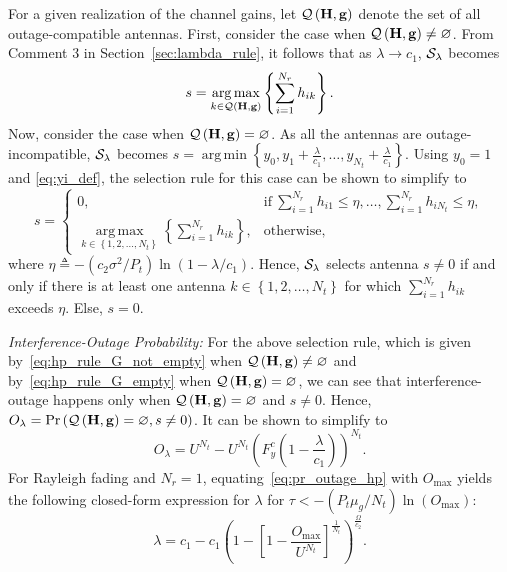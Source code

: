 \documentclass[12pt,draftcls,peerreview,onecolumn]{IEEEtran}
\newcommand{\brac}[1]{\left({#1}\right)}
\newcommand{\define}{\triangleq}
\newcommand{\tendsto}{\to}
\newcommand{\mtx}[1]{{\bf #1}} %
\newcommand{\prob}[1]{\text{Pr}\brac{#1}}
\DeclareMathOperator*{\argmin}{arg\,min}
\DeclareMathOperator*{\argmax}{arg\,max}
\newcommand{\nx}{{0}}
\newcommand{\lam}{\lambda}
\newcommand{\mug}{{\mu_{g}}}
\newcommand{\goodset}{\cal{Q\left(\Hmx,\g \right) }}
\newcommand{\Nt}{{N_t}}
\newcommand{\Nr}{{N_r}}
\newcommand{\Pt}{{P_t}}
\newcommand{\such}{h}
\newcommand{\puch}{g}
\newcommand{\hk}[1]{{\such_{#1}}}
\newcommand{\g}{\mathbf{\puch}}
\newcommand{\noisevar}{\sigma^2}
\newcommand{\outmax}{O_{\text{max}}}
\newcommand{\itau}{\tau}
\newcommand{\cone}{c_{1}}
\newcommand{\ctwo}{c_{2}}
\newcommand{\out}{O}
\newcommand{\lambym}{\frac{\lam}{\cone}}
\newcommand{\yk}[1]{y_{#1}}
\newcommand{\al}{\ctwo}
\newcommand{\snr}{\Omega}
\newcommand{\albysnr}[1][]{\frac{\al#1}{\snr}}
\newcommand{\snrbyal}[1][]{\frac{\snr#1}{\al}}
\newcommand{\un}{U}
\newcommand{\antopts}{\left\{1,2,\ldots,\Nt\right\}}
\newcommand{\igammainline}{{- \left( {\al\noisevar}/{\Pt}\right)  \ln\left({1-\lam/\cone }\right) }}
\newcommand{\Hmx}{\mtx{H}}
\newcommand{\callamrule}{{\cal S_{{\lam}}}}
\newcommand{\outlam}{\out_{\lam}}
\newcommand{\nullset}{\varnothing}
\newcommand{\ccdfyrv}[1]{ F^{c}_{y}\left(#1 \right) }
\newcommand{\sumnr}{\sum_{i=1}^{\Nr}}
\newcommand{\gammath}{\eta}
\begin{document}
For a given realization of the channel gains, let $\goodset$ denote the set of all outage-compatible antennas. First, consider the case when $\goodset\neq\nullset$. From Comment 3 in Section~\ref{sec:lambda_rule}, it follows that as $\lam \tendsto \cone$, $\callamrule$ becomes 
\begin{equation}
\label{eq:hp_rule_G_not_empty}
s = \argmax_{k\in\goodset}\left\lbrace \sumnr \hk{ik}\right\rbrace. 
\end{equation}
Now, consider the case when $\goodset= \nullset$. As all the antennas are outage-incompatible, $\callamrule$ becomes $s = \argmin\left\lbrace  \yk{0},\yk{1}+\lambym,\ldots,\yk{\Nt}+\lambym \right\rbrace$. Using $\yk{0}=1$ and \eqref{eq:yi_def}, the selection rule for this case can be shown to simplify to  
\begin{equation}
\label{eq:hp_rule_G_empty}
s = \left\{
\begin{array}{ll}
0 , & \text{if}~\sumnr\hk{i1}\leq\gammath,\ldots, \sumnr\hk{i\Nt}\leq\gammath, \\
\argmax\limits_{k\in\antopts}\left\lbrace \sumnr\hk{ik}\right\rbrace , &\text{otherwise},
\end{array}\right.
\end{equation}
where $\gammath\define\igammainline$. Hence, $\callamrule$ selects antenna $s\neq0$ if and only if there is at least one antenna $k\in\antopts$ for which $\sumnr \hk{ik}$ exceeds $\gammath$. Else, $s=0$. 


{\em Interference-Outage Probability:} For the above selection rule, which is given by~\eqref{eq:hp_rule_G_not_empty} when $\goodset\neq\nullset$ and by~\eqref{eq:hp_rule_G_empty} when $\goodset=\nullset$, we can see that interference-outage happens only when $\goodset=\nullset$ and  $s\neq\nx$. Hence,  $\outlam=\prob{{\goodset}=\nullset, s \neq 0}$. It can be shown to simplify to
\begin{equation}
\label{eq:pr_outage_hp}
\outlam = \un^{\Nt} - \un^{\Nt}\left(\ccdfyrv{1-\lambym} \right)^{\Nt}.
\end{equation}
%
For Rayleigh fading and $\Nr=1$, equating~\eqref{eq:pr_outage_hp} with $\outmax$ yields the following closed-form expression for $\lam$ for $\itau<-\left({\Pt\mug}/{\Nt}\right) \ln\left({\outmax}\right)$: 
\begin{equation}
\label{eq:lam_asym}
\lam  =  \cone - \cone\left(1 - \left[1 - \frac{\outmax}{\un^{\Nt}}\right]^{\frac{1}{\Nt}} \right)^{\snrbyal[]}.
\end{equation}
%
\end{document}
